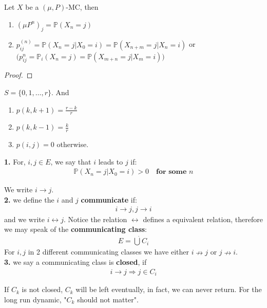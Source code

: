 \begin{corollary}
	Let $X$ be a $(\mu, P)$-MC, then
	\begin{enumerate}
		\item $(\mu P^n)_j = \mathbb{P}(X_n = j)$
		\item $p^{(n)}_{ij} = \mathbb{P}(X_n = j|X_0 = i) = \mathbb{P}(X_{n + m} = j|X_n = i)$ or $\bigg(p_{ij}^n = \mathbb{P}_i(X_n = j) = \mathbb{P}(X_{m+n} = j| X_m = i)\bigg)$
	\end{enumerate}
\end{corollary}
\begin{proof}
\end{proof}

\begin{example}[M/G/1 queue]
\end{example}

\begin{example}
\end{example}

\begin{example}
$S = \{0, 1, \dots, r\}$. And
\begin{enumerate}
	\item $p(k, k+1) = \frac{r-k}{r}$
	\item $p(k, k-1) = \frac{k}{r}$
	\item $p(i, j) = 0$ otherwise.
\end{enumerate}
\end{example}



\begin{definition}
	\textbf{1.} For, $i, j \in E$, we say that $i$ leads to $j$ if:
	\begin{align*}
		\mathbb{P}(X_n = j| X_0 = i) > 0 \quad \textbf{for some $n$}
	\end{align*}

	We write $i \rightarrow j$. \\
	\textbf{2. }we define the $i$ and $j$ \textbf{communicate} if:
	\begin{align*}
		i \rightarrow j, j \rightarrow i
	\end{align*}
	and we write $i \leftrightarrow j$. Notice the relation $\leftrightarrow$ defines a equivalent relation, therefore we may speak of the \textbf{communicating class}: 
	\begin{align*}
		E = \dot{\bigcup} C_i
	\end{align*}
	For $i, j$ in 2 different communicating classes we have either $i \nrightarrow j$ or $j \nrightarrow i$. \\
	\textbf{3.} we say a communicating class is \textbf{closed}, if 
	\begin{align*}
		i \rightarrow j \Rightarrow j \in C_i
	\end{align*}
\end{definition}
\begin{remark}
If $C_k$ is not closed, $C_k$ will be left eventually, in fact, we can never return. For the long run dynamic, "$C_k$ should not matter".
\end{remark}

